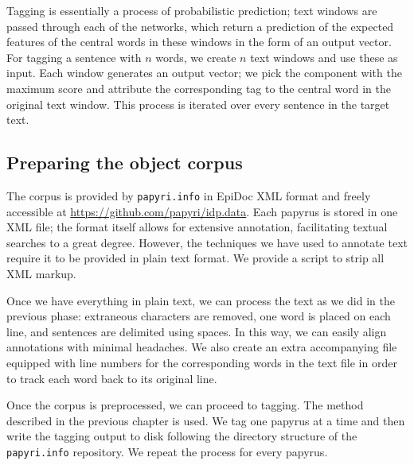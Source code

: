 Tagging is essentially a process of probabilistic prediction; text
windows are passed through each of the networks, which return a
prediction of the expected features of the central words in these
windows in the form of an output vector. For tagging a sentence with
$n$ words, we create $n$ text windows and use these as input. Each
window generates an output vector; we pick the component with the
maximum score and attribute the corresponding tag to the central word
in the original text window. This process is iterated over every
sentence in the target text. 

\subsection{Preparing the object corpus}
\label{sec:createmodel}
The corpus is provided by \texttt{papyri.info} in EpiDoc XML format
and freely accessible at
\url{https://github.com/papyri/idp.data}. Each papyrus is stored in
one XML file; the format itself allows for extensive annotation,
facilitating textual searches to a great degree. However, the
techniques we have used to annotate text require it to be provided in
plain text format. We provide a script to strip all XML markup.

Once we have everything in plain text, we can process the text as we
did in the previous phase: extraneous characters are removed, one word
is placed on each line, and sentences are delimited using spaces. In
this way, we can easily align annotations with minimal headaches. We
also create an extra accompanying file equipped with line numbers for
the corresponding words in the text file in order to track each word
back to its original line.

Once the corpus is preprocessed, we can proceed to tagging. The method
described in the previous chapter is used. We tag one papyrus at a
time and then write the tagging output to disk following the directory
structure of the \texttt{papyri.info} repository. We repeat the process
for every papyrus. 
